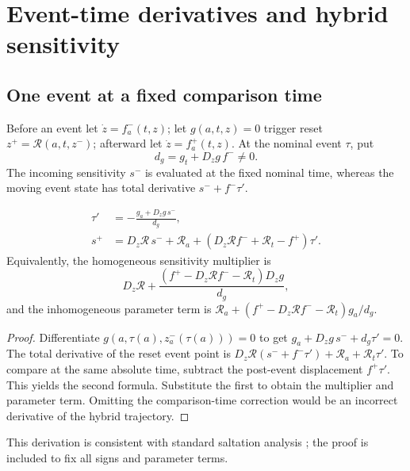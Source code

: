 \section{Event-time derivatives and hybrid sensitivity}\label{sec:hybrid}
\subsection{One event at a fixed comparison time}
Before an event let $\dot z=f_a^-(t,z)$; let $g(a,t,z)=0$ trigger reset $z^+=\mathcal R(a,t,z^-)$; afterward let $\dot z=f_a^+(t,z)$. At the nominal event $\tau$, put
\[
 d_g=g_t+D_zg\,f^-\ne0.
\]
The incoming sensitivity $s^-$ is evaluated at the fixed nominal time, whereas the moving event state has total derivative $s^-+f^-\tau'$.

\begin{proposition}\label{prop:saltation}
\begin{align}
 \tau'&=-\frac{g_a+D_zg\,s^-}{d_g},\\
 s^+&=D_z\mathcal R\,s^-+\mathcal R_a
 +(D_z\mathcal R f^-+\mathcal R_t-f^+)\tau'.
 \label{eq:saltation}
\end{align}
Equivalently, the homogeneous sensitivity multiplier is
\[
 D_z\mathcal R+
 \frac{(f^+-D_z\mathcal R f^--\mathcal R_t)D_zg}{d_g},
\]
and the inhomogeneous parameter term is
$\mathcal R_a+(f^+-D_z\mathcal R f^--\mathcal R_t)g_a/d_g$.
\end{proposition}
\begin{proof}
Differentiate $g(a,\tau(a),z_a^-(\tau(a)))=0$ to get
$g_a+D_zg\,s^-+d_g\tau'=0$. The total derivative of the reset event point is
$D_z\mathcal R(s^-+f^-\tau')+\mathcal R_a+\mathcal R_t\tau'$.
To compare at the same absolute time, subtract the post-event displacement $f^+\tau'$. This yields the second formula. Substitute the first to obtain the multiplier and parameter term. Omitting the comparison-time correction would be an incorrect derivative of the hybrid trajectory.
\end{proof}

This derivation is consistent with standard saltation analysis \cite{KongEtAl}; the proof is included to fix all signs and parameter terms.

